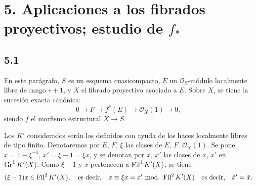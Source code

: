 \providecommand{\sisi}[2]{#2}

\section*{5. Aplicaciones a los fibrados proyectivos; estudio de \texorpdfstring{$f_*$}{f*}}

\subsection*{5.1}
En este parágrafo, $S$ es un esquema cuasicompacto, $E$ un $\mathcal O_S$-módulo localmente libre de rango $r+1$, y $X$ el fibrado proyectivo asociado a $E$. Sobre $X$, se tiene la sucesión exacta canónica:
\[
  0\longrightarrow F\longrightarrow f^*(E)\longrightarrow \mathcal O_X(1)\longrightarrow 0,
\]
siendo $f$ el morfismo estructural $X\longrightarrow S$.

Los $K'$ considerados serán los definidos con ayuda de los haces localmente libres de tipo finito. Denotaremos por $E$, $F$, $\xi$ las clases de $E$, $F$, $\mathcal O_X(1)$. Se pone $x=1-\xi^{-1}$, $x'=\xi-1=\xi x$, y se denotan por $\bar x$, $\bar x'$ las clases de $x$, $x'$ en $\operatorname{Gr}^1K'(X)$. Como $\xi-1$ y $x$ pertenecen a $\operatorname{Fil}^1K'(X)$, se tiene
\[
  (\xi-1)x\in\Fil^2K'(X),
  \quad\text{es decir,}\quad x\equiv \xi x=x' \ \mathrm{mod.}\ \Fil^2K'(X)
  \quad\text{es decir,}\quad \bar x'= \sisi{-\bar x}{\bar x} .
\]

